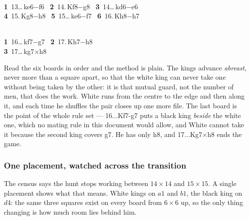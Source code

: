 \documentclass[11pt]{article}
\begin{document}
\smallskip

\begin{minipage}{0.47\textwidth}\centering
  \\[1.2mm]
  {\scriptsize\color{inksoft}\textbf{1}~13\ldots\,ke6$-$f6 \ \textbf{2}~14.\,Kf8$-$g8 \ \textbf{3}~14\ldots\,kd6$-$e6\\\textbf{4}~15.\,Kg8$-$h8 \ \textbf{5}~15\ldots\,ke6$-$f7 \ \textbf{6}~16.\,Kh8$-$h7}
\end{minipage}\hfill
\begin{minipage}{0.47\textwidth}\centering
  \\[1.2mm]
  {\scriptsize\color{inksoft}\textbf{1}~16\ldots\,kf7$-$g7 \ \textbf{2}~17.\,Kh7$-$h8\\\textbf{3}~17\ldots\,kg7$\times$h8}
\end{minipage}

\smallskip

\noindent
Read the six boards in order and the method is plain. The kings advance
\emph{abreast}, never more than a square apart, so that the white king can
never take one without being taken by the other: it is that mutual guard, not
the number of men, that does the work. White runs from the centre to the edge
and then along it, and each time he shuffles the pair closes up one more file.
The last board is the point of the whole rule set --- 16$\ldots$Kf7-g7 puts a
black king \emph{beside} the white one, which no mating rule in this document
would allow, and White cannot take it because the second king covers g7. He has
only h8, and 17$\ldots$Kg7$\times$h8 ends the game.

\subsubsection{One placement, watched across the transition}\label{sub:cap-hunt-reach}

\noindent
The census says the hunt stops working between $14\times14$ and $15\times15$. A
single placement shows what that means. White kings on $a1$ and $b1$, the black
king on $d4$: the same three squares exist on every board from $6\times6$ up, so
the only thing changing is how much room lies behind him.
\end{document}
